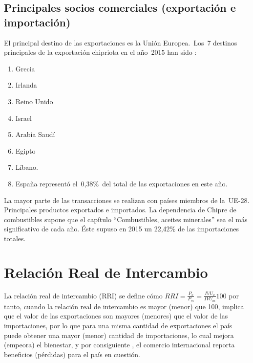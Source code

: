 \documentclass[a4paper,openright,12pt]{book}
\begin{document}
\subsection{Principales socios comerciales (exportación e importación)}

El principal destino de las exportaciones es la Unión Europea. Los 7 destinos principales de la exportación chipriota en el año 2015 han sido\cite{OMCExamen} \cite{ICEXChipre96:online}:

\begin{enumerate}
    \item Grecia
    \item Irlanda
    \item Reino Unido
    \item Israel
    \item Arabia Saudí
    \item Egipto
    \item Líbano.
    \item España representó el 0,38\% del total de las exportaciones en este año. 
\end{enumerate}

La mayor parte de las transacciones se realizan con países miembros de la UE-28. Principales productos exportados e importados. La dependencia de Chipre de combustibles supone que el capítulo “Combustibles, aceites minerales” sea el más significativo de cada año. Éste supuso en 2015 un 22,42\% de las importaciones totales\cite{ICEXEspa16:online}.

\section{Relación Real de Intercambio}

La relación real de intercambio (RRI) se define cómo $RRI = \frac{P_x}{P_m} = \frac{IVU_x}{IVU_m} 100$ \cite{krugman2015international}  por tanto, cuando la relación real de intercambio es mayor (menor) que 100, implica que el valor de las exportaciones son mayores (menores) que el valor de las importaciones, por lo que para una misma cantidad de exportaciones el país puede obtener una mayor (menor) cantidad de importaciones, lo cual mejora (empeora) el bienestar, y por consiguiente , el comercio internacional reporta beneficios (pérdidas) para el país en cuestión.
\end{document}
